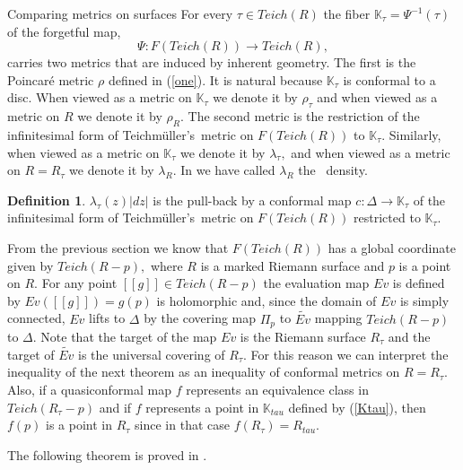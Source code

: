 \documentclass[12pt]{amsart}
\newcommand{\tes}{Teich\-m\"ul\-ler's}
\theoremstyle{remark}
\theoremstyle{definition}
\newtheorem{definition}{Definition}
\theoremstyle{definition}
\begin{document}
  
  \begin{section}{Comparing metrics on surfaces}
  For every $\tau \in Teich(R)$ the fiber ${\mathbb K}_{\tau}=\Psi^{-1}(\tau)$ of the forgetful map,
   \begin{equation}\label{forget2} \Psi:F(Teich(R)) \rightarrow Teich(R),
   \end{equation}
   carries two metrics that are induced by  inherent geometry.   The first is the Poincar\'e metric $\rho$
   defined in (\ref{one}).  It is natural because ${\mathbb K}_{\tau}$ is conformal to a disc.   When viewed as 
   a metric on ${\mathbb K}_{\tau}$ we denote it 
   by $\rho_{\tau}$ and when viewed as a metric on $R$ we denote it by $\rho_R.$
      The second metric is the restriction of the  infinitesimal form  of \tes\ metric on $F(Teich(R))$ to ${\mathbb K}_{\tau}.$  Similarly, when viewed as a metric on ${\mathbb K}_{\tau}$ we denote it by $\lambda_{\tau},$ and when viewed as a metric on $R=R_{\tau}$ we denote it by $\lambda_{R}.$  In \cite{GardinerLakic3} we have called $\lambda_{R}$ the \te\ density.
     
   \begin{definition}\label{tdensity} $\lambda_{\tau}(z)|dz|$ is the pull-back by a conformal map $c:\Delta \rightarrow {\mathbb K}_{\tau}$  of the infinitesimal form of  \tes\ metric on $F(Teich(R))$
 restricted to    ${\mathbb K}_{\tau}.$   \end{definition}
 
   From the previous section we know that $F(Teich(R))$ has a global coordinate given by 
   $Teich(R-p),$  
   where $R$ is a marked Riemann surface and $p$ is a point on $R.$
   For any point $[[g]] \in Teich(R-p)$ the evaluation map $Ev$ is defined by $Ev([[g]])=g(p)$ is holomorphic 
   and, since the domain of $Ev$ is simply connected, $Ev$ lifts to $\Delta$ by the covering map $\Pi_p$ to $\widetilde{Ev}$ mapping $Teich(R-p)$ to 
   $\Delta.$  Note that the target of the map $Ev$ is the Riemann surface $R_{\tau}$ and the target of $\widetilde{Ev}$ is the universal covering of $R_{\tau}.$
For this reason we can interpret the inequality of the next theorem as an inequality of conformal metrics on $R=R_{\tau}.$
Also, if a quasiconformal map $f$ represents an equivalence class in $Teich(R_{\tau}-p)$  
and if $f$ represents a point in ${\mathbb K}_{tau}$ defined by (\ref{Ktau}), then $f(p)$ is a point in $R_{\tau}$ since in that case $f(R_{\tau})=R_{tau}.$  



The following theorem is proved in \cite{GardinerLakic3}.
   

\end{section}
\end{document}
